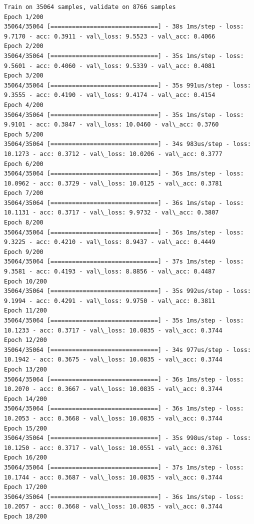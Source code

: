 \documentclass[11pt]{article}
\begin{document}
    \begin{Verbatim}[commandchars=\\\{\}]
Train on 35064 samples, validate on 8766 samples
Epoch 1/200
35064/35064 [==============================] - 38s 1ms/step - loss: 9.7170 - acc: 0.3911 - val\_loss: 9.5523 - val\_acc: 0.4066
Epoch 2/200
35064/35064 [==============================] - 35s 1ms/step - loss: 9.5601 - acc: 0.4060 - val\_loss: 9.5339 - val\_acc: 0.4081
Epoch 3/200
35064/35064 [==============================] - 35s 991us/step - loss: 9.3555 - acc: 0.4190 - val\_loss: 9.4174 - val\_acc: 0.4154
Epoch 4/200
35064/35064 [==============================] - 35s 1ms/step - loss: 9.9101 - acc: 0.3847 - val\_loss: 10.0460 - val\_acc: 0.3760
Epoch 5/200
35064/35064 [==============================] - 34s 983us/step - loss: 10.1273 - acc: 0.3712 - val\_loss: 10.0206 - val\_acc: 0.3777
Epoch 6/200
35064/35064 [==============================] - 36s 1ms/step - loss: 10.0962 - acc: 0.3729 - val\_loss: 10.0125 - val\_acc: 0.3781
Epoch 7/200
35064/35064 [==============================] - 36s 1ms/step - loss: 10.1131 - acc: 0.3717 - val\_loss: 9.9732 - val\_acc: 0.3807
Epoch 8/200
35064/35064 [==============================] - 36s 1ms/step - loss: 9.3225 - acc: 0.4210 - val\_loss: 8.9437 - val\_acc: 0.4449
Epoch 9/200
35064/35064 [==============================] - 37s 1ms/step - loss: 9.3581 - acc: 0.4193 - val\_loss: 8.8856 - val\_acc: 0.4487
Epoch 10/200
35064/35064 [==============================] - 35s 992us/step - loss: 9.1994 - acc: 0.4291 - val\_loss: 9.9750 - val\_acc: 0.3811
Epoch 11/200
35064/35064 [==============================] - 35s 1ms/step - loss: 10.1233 - acc: 0.3717 - val\_loss: 10.0835 - val\_acc: 0.3744
Epoch 12/200
35064/35064 [==============================] - 34s 977us/step - loss: 10.1942 - acc: 0.3675 - val\_loss: 10.0835 - val\_acc: 0.3744
Epoch 13/200
35064/35064 [==============================] - 36s 1ms/step - loss: 10.2070 - acc: 0.3667 - val\_loss: 10.0835 - val\_acc: 0.3744
Epoch 14/200
35064/35064 [==============================] - 36s 1ms/step - loss: 10.2053 - acc: 0.3668 - val\_loss: 10.0835 - val\_acc: 0.3744
Epoch 15/200
35064/35064 [==============================] - 35s 998us/step - loss: 10.1250 - acc: 0.3717 - val\_loss: 10.0551 - val\_acc: 0.3761
Epoch 16/200
35064/35064 [==============================] - 37s 1ms/step - loss: 10.1744 - acc: 0.3687 - val\_loss: 10.0835 - val\_acc: 0.3744
Epoch 17/200
35064/35064 [==============================] - 36s 1ms/step - loss: 10.2057 - acc: 0.3668 - val\_loss: 10.0835 - val\_acc: 0.3744
Epoch 18/200

\end{Verbatim}
\end{document}

